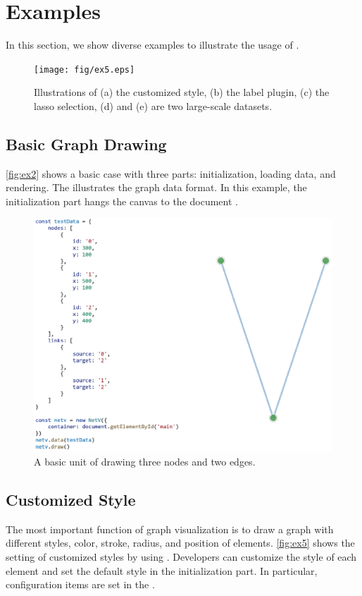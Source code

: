 \section{Examples}
In this section, we show diverse examples to illustrate the usage of \name.
\begin{figure}
    \texttt{[image: fig/ex5.eps]}
    \caption{
        Illustrations of (a) the customized style, (b) the label plugin, (c) the lasso selection, (d) and (e) are two large-scale datasets.
    }
    \label{fig:ex5}
\end{figure}

\subsection{Basic Graph Drawing}
\autoref{fig:ex2} shows a basic case with three parts: initialization, loading data, and rendering. The  illustrates the graph data format. In this example, the initialization part hangs the canvas to the document .
\begin{figure}
    \includegraphics[width=\linewidth]{fig/ex2.eps}
    \caption{
        A basic unit of drawing three nodes and two edges.
    }
    \label{fig:ex2}
\end{figure}

\subsection{Customized Style}
The most important function of graph visualization is to draw a graph with different styles,   color, stroke, radius, and position of elements.
\autoref{fig:ex5} shows the setting of customized styles by using \name. Developers can customize the style of each element and set the default style in the initialization part. In particular,  configuration items are set in the .


